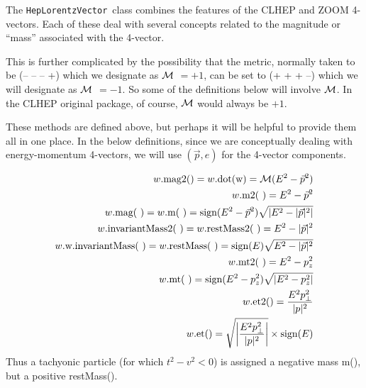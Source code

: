 \documentclass[twoside,12pt]{article}
\def \LV {{\tt HepLorentzVector}}
\begin{document}
The \LV\ class combines the features of the CLHEP and ZOOM 4-vectors.
Each of these deal with several concepts related to the magnitude or
``mass'' associated with the 4-vector.  

This is further complicated by the possibility that the metric, 
normally taken to be (-- -- -- +) which we designate as $\cal M$ $= +1$,
can be set to (+ + + --) which we will designate as $\cal M$ $= -1$. 
So some of the definitions below will involve $\cal M$.
In the CLHEP original package, of course, $\cal M$ would always be $+1$.

These methods are defined above, but perhaps it will be helpful to 
provide them all in one place.
In the below definitions, since we are conceptually dealing with 
energy-momentum 4-vectors, we will use $(\vec{p},e)$ for the 4-vector 
components.


\begin{eqnarray}
w\mbox{.mag2()} = w\mbox{.dot(w)} = {\cal M} (E^2 - \vec{p}^2) 		\\
w\mbox{.m2(~)} = E^2 - \vec{p}^2 					\\
w\mbox{.mag(~)} = w\mbox{.m(~)} = 
	\mbox{sign}(E^2 - \vec{p}^2) \sqrt{\left|E^2 - |\vec{p}|^2\right|} \\
w\mbox{.invariantMass2(~)} = w\mbox{.restMass2(~)} = E^2 - |\vec{p}|^2 	\\
w\mbox{.w.invariantMass(~)} = w\mbox{.restMass(~)} =
	\mbox{sign}(E) \sqrt{E^2 - |\vec{p}|^2} \\  
w\mbox{.mt2(~)} = E^2 - p_z^2 	\\
w\mbox{.mt(~)} = 
	\mbox{sign}(E^2 - p_z^2) \sqrt{\left|E^2 - p_z^2\right|} \\
w\mbox{.et2}() = \frac {E^2 p_\perp^2}{|p|^2} \\
w\mbox{.et}() = \sqrt { \left| \frac {E^2 p_\perp^2}{|p|^2} \right| } 
			\times \mbox{sign}(E)
\end{eqnarray}
Thus a tachyonic particle (for which $t^2-v^2 < 0$) is assigned a 
negative mass m(), but a positive restMass().
\end{document}
